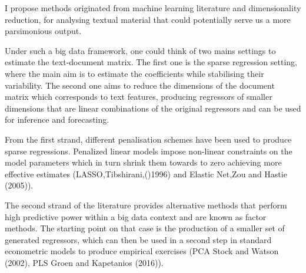 \documentclass[12pt]{article}
\begin{document}
I propose methods originated from machine learning literature and dimensionality reduction, for analysing textual material that could potentially serve us a more parsimonious output.

Under such a big data framework, one could think of two mains settings to estimate the text-document matrix. The first one is the sparse regression setting, where the main aim is to estimate the coefficients while stabilising their variability. The second one aims to reduce the dimensions of the document matrix which corresponds to text features, producing regressors of smaller dimensions that are linear combinations of the original regressors and can be used for inference and forecasting.

From the first strand, different penalisation schemes have been used to produce sparse regressions. Penalized linear models impose non-linear constraints on the model parameters which in turn shrink them towards to zero achieving more effective estimates (LASSO,Tibshirani,()1996) and Elastic Net,Zou and Hastie (2005)).

The second strand of the literature provides alternative methods that  perform high predictive power within a big data context and are known as factor methods. The starting point on that case is the production of a smaller set of generated regressors, which can then be used in a second step in standard econometric models to produce empirical exercises (PCA Stock and Watson (2002), PLS Groen and Kapetanios (2016)).

\nocite{*}

\end{document}
